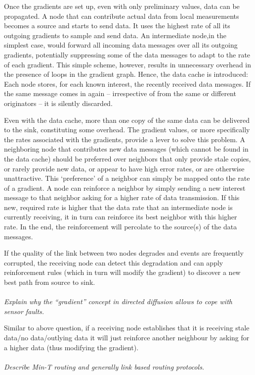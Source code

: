 \documentclass[12pt]{article}
\newcommand*\circled[1]{\tikz[baseline=(char.base)]{
		\node[shape=circle,draw,inner sep=0pt] (char) {#1};}}
\begin{document}
Once the gradients are set up, even with only preliminary values, data can be
propagated. A node that can contribute actual data from local measurements
becomes a source and starts to send data. It uses the highest rate of all its
outgoing gradients to sample and send data. An intermediate node,in the
simplest case, would forward all incoming data messages over all its outgoing
gradients, potentially suppressing some of the data messages to adapt to the
rate of each gradient. This simple scheme, however, results in unnecessary
overhead in the presence of loops in the gradient graph. Hence, the data cache
is introduced: Each node stores, for each known interest, the recently received
data messages. If the same message comes in again -- irrespective of from the
same or different originators -- it is silently discarded.

Even with the data cache, more than one copy of the same data can be delivered
to the sink, constituting some overhead. The gradient values, or more
specifically the rates associated with the gradients, provide a lever to solve
this problem. A neighboring node that contributes new data messages (which
cannot be found in the data cache) should be preferred over neighbors that only
provide stale copies, or rarely provide new data, or appear to have high error
rates, or are otherwise unattractive. This `preference' of a neighbor can
simply be mapped onto the rate of a gradient. A node can reinforce a neighbor
by simply sending a new interest message to that neighbor asking for a higher
rate of data transmission. If this new, required rate is higher that the data
rate that an intermediate node is currently receiving, it in turn can reinforce
its best neighbor with this higher rate. In the end, the reinforcement will
percolate to the source(s) of the data messages.

If the quality of the link between two nodes degrades and events are frequently
corrupted, the receiving node can detect this degradation and can apply
reinforcement rules (which in turn will modify the gradient) to discover a new
best path from source to sink. 
\\
\\
\textit{\circled{9.} Explain why the ``gradient'' concept in directed diffusion
allows to cope with sensor faults.}

Similar to above question, if a receiving node establishes that it is receiving
stale data/no data/outlying data it will just reinforce another neighbour by
asking for a higher data (thus modifying the gradient).
\\
\\
\textit{\circled{10.} Describe Min-T routing and generally link based routing
protocols.}
\end{document}
